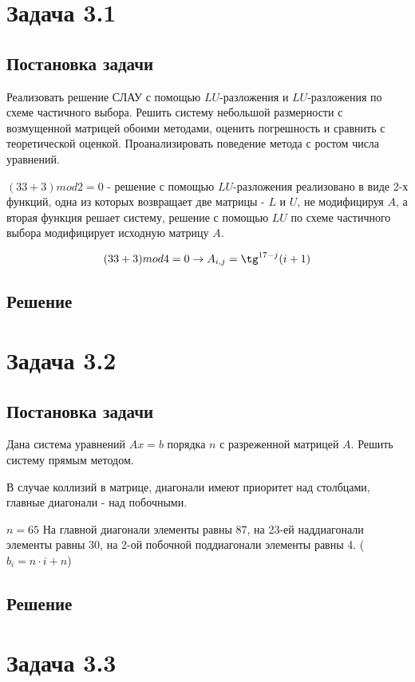 \documentclass[a4paper,12pt]{report} %
\begin{document}
\section*{Задача 3.1}
\subsection*{Постановка задачи}

Реализовать решение СЛАУ с помощью $LU$-разложения и $LU$-разложения по схеме частичного выбора.
Решить систему небольшой размерности с возмущенной матрицей обоими методами, оценить погрешность и сравнить с теоретической оценкой. Проанализировать поведение метода с ростом числа уравнений.

$(33 + 3) mod 2 = 0$ - решение с помощью $LU$-разложения  реализовано в виде 2-х функций, одна из которых возвращает две матрицы - $L$ и $U$, не модифицируя $A$, а вторая функция решает систему, решение с помощью $LU$ по схеме частичного выбора модифицирует исходную матрицу $A$.

\[
	(33+3) mod 4 = 0 \to A_{i, j} = \tg^{17-j}(i + 1)
\]
\subsection*{Решение}

\section*{Задача 3.2}
\subsection*{Постановка задачи}

Дана система уравнений $Ax = b$ порядка $n$ с разреженной матрицей $A$. Решить систему прямым методом.

В случае коллизий в матрице, диагонали имеют приоритет над столбцами, главные диагонали - над побочными.

$n = 65$ На главной диагонали элементы равны 87, на 23-ей наддиагонали элементы равны 30, на 2-ой побочной поддиагонали элементы равны 4. ($b_i = n \cdot i + n$) 
\subsection*{Решение}

\section*{Задача 3.3}
\end{document}
